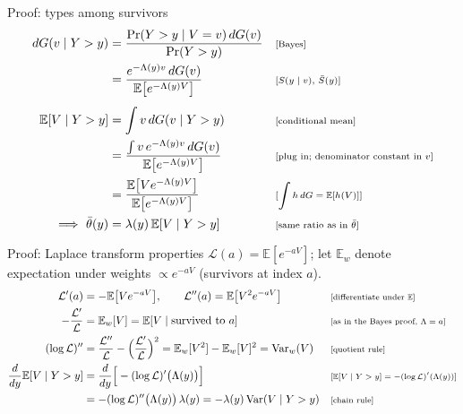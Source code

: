 \documentclass[aspectratio=169,10pt]{beamer}
\newcommand{\E}{\mathbb{E}}
\newcommand{\Lap}{\mathcal{L}}
\newcommand{\var}{\operatorname{Var}}
\newcommand{\why}[1]{\text{\scriptsize[#1]}}
\begin{document}
\begin{frame}[label=p-bayes]{Proof: types among survivors}
  \begin{align*}
    dG(v\mid Y>y) &= \frac{\Pr(Y>y\mid V=v)\,dG(v)}{\Pr(Y>y)} && \why{Bayes} \\
    &= \frac{e^{-\Lambda(y)v}\,dG(v)}{\E\big[e^{-\Lambda(y)V}\big]} && \why{$S(y\mid v)$, $\bar S(y)$} \\[4pt]
    \E[V\mid Y>y] &= \int v\,dG(v\mid Y>y) && \why{conditional mean} \\
    &= \frac{\int v\,e^{-\Lambda(y)v}\,dG(v)}{\E\big[e^{-\Lambda(y)V}\big]} && \why{plug in; denominator constant in $v$} \\
    &= \frac{\E\big[Ve^{-\Lambda(y)V}\big]}{\E\big[e^{-\Lambda(y)V}\big]} && \why{$\int h\,dG=\E[h(V)]$} \\
    \Longrightarrow\ \bar\theta(y) &= \lambda(y)\,\E[V\mid Y>y] && \why{same ratio as in $\bar\theta$}
  \end{align*}
\end{frame}

\begin{frame}[label=p-lap]{Proof: Laplace transform properties}
  \small
  $\Lap(a)=\E[e^{-aV}]$; let $\E_w$ denote expectation under weights $\propto e^{-aV}$ (survivors at index $a$).
  \begin{align*}
    \Lap'(a) &= -\E\big[Ve^{-aV}\big],\qquad \Lap''(a)=\E\big[V^2e^{-aV}\big] && \why{differentiate under $\E$} \\
    -\frac{\Lap'}{\Lap} &= \E_w[V] = \E[V\mid\text{survived to }a] && \why{as in the Bayes proof, $\Lambda=a$} \\
    (\log\Lap)'' &= \frac{\Lap''}{\Lap}-\Big(\frac{\Lap'}{\Lap}\Big)^2 = \E_w[V^2]-\E_w[V]^2=\var_w(V) && \why{quotient rule} \\
    \frac{d}{dy}\E[V\mid Y>y] &= \frac{d}{dy}\Big[-(\log\Lap)'\big(\Lambda(y)\big)\Big] && \why{$\E[V\mid Y>y]=-(\log\Lap)'(\Lambda(y))$} \\
    &= -(\log\Lap)''\big(\Lambda(y)\big)\,\lambda(y) = -\lambda(y)\var(V\mid Y>y) && \why{chain rule}
  \end{align*}
  \hyperlink{p-lap2}{}
\end{frame}
\end{document}
